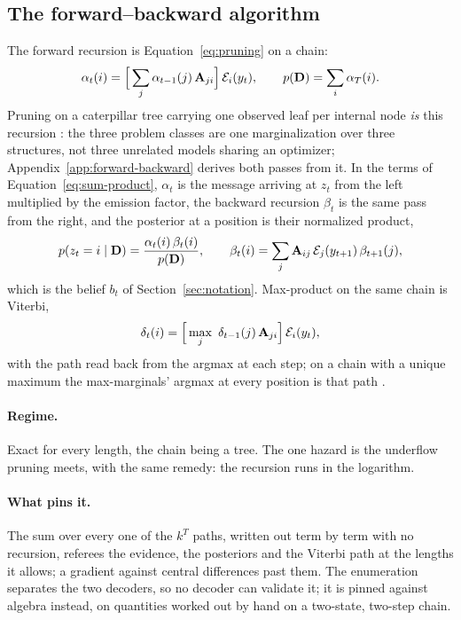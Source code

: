 \documentclass[11pt,a4paper]{article}
\begin{document}
\subsection{The forward--backward algorithm}
The forward recursion is Equation~\ref{eq:pruning} on a chain:
\begin{equation}
  \alpha_t(i) = \Big[ \sum_j \alpha_{t-1}(j)\, \mathbf{A}_{ji} \Big]
                \, \mathcal{E}_i(y_t),
  \qquad
  p(\mathbf{D}) = \sum_i \alpha_T(i).
  \label{eq:forward}
\end{equation}
Pruning on a caterpillar tree carrying one observed leaf per internal node
\emph{is} this recursion \citep{durbin1998, koller2009}: the three problem
classes are one marginalization over three structures, not three unrelated
models sharing an optimizer; Appendix~\ref{app:forward-backward} derives
both passes from it. In the terms of Equation~\ref{eq:sum-product},
$\alpha_t$ is the message arriving at $z_t$ from the left multiplied by the
emission factor, the backward recursion $\beta_t$ is the same pass from the
right, and the posterior at a position is their normalized product,
\begin{equation}
  p(z_t = i \mid \mathbf{D}) = \frac{\alpha_t(i)\, \beta_t(i)}{p(\mathbf{D})},
  \qquad
  \beta_t(i) = \sum_j \mathbf{A}_{ij}\, \mathcal{E}_j(y_{t+1})\, \beta_{t+1}(j),
  \label{eq:posterior}
\end{equation}
which is the belief $b_t$ of Section~\ref{sec:notation}. Max-product on the
same chain is Viterbi,
\begin{equation}
  \delta_t(i) = \Big[\max_j\ \delta_{t-1}(j)\, \mathbf{A}_{ji}\Big]\, \mathcal{E}_i(y_t),
  \label{eq:viterbi}
\end{equation}
with the path read back from the argmax at each step; on a chain with a
unique maximum the max-marginals' argmax at every position is that path
\citep{durbin1998}.

\paragraph{Regime.}
Exact for every length, the chain being a tree. The one hazard is the underflow
pruning meets, with the same remedy: the recursion runs in the logarithm.

\paragraph{What pins it.}
The sum over every one of the $k^T$ paths, written out term by term with no
recursion, referees the evidence, the posteriors and the Viterbi path at the
lengths it allows; a gradient against central differences past them. The
enumeration separates the two decoders, so no decoder can validate it; it is
pinned against algebra instead, on quantities worked out by hand on a
two-state, two-step chain.
\end{document}

